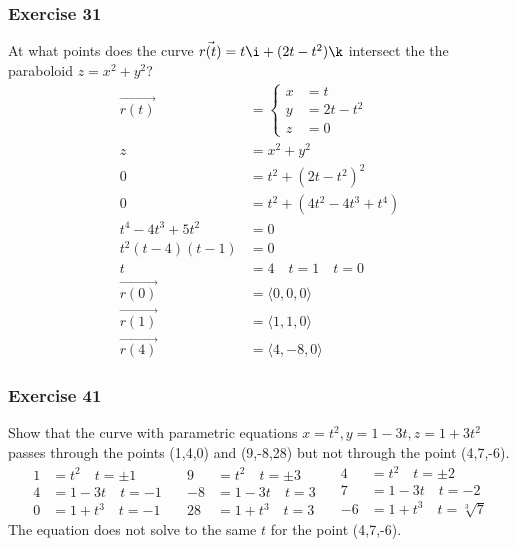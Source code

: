 \documentclass{math}
\begin{document}
\subsubsection*{Exercise 31}
At what points does the curve \( \vec{r(t)} = t\i+(2t-t^2)\k \) intersect the
the paraboloid \( z = x^2+y^2 \)?
\begin{align*}
  \overrightarrow{r(t)} &= \begin{cases}
    x &= t \\
    y &= 2t-t^2 \\
    z &= 0
  \end{cases} \\
  z &= x^2+y^2 \\
  0 &= t^2+(2t-t^2)^2 \\
  0 &= t^2+(4t^2-4t^3+t^4) \\
  t^4-4t^3+5t^2 &= 0 \\
  t^2(t-4)(t-1) &= 0 \\
  t &= 4 \quad t = 1 \quad t = 0 \\
  \overrightarrow{r(0)} &= \langle0,0,0\rangle \\
  \overrightarrow{r(1)} &= \langle1,1,0\rangle \\
  \overrightarrow{r(4)} &= \langle4,-8,0\rangle
\end{align*}

\subsubsection*{Exercise 41}
Show that the curve with parametric equations \( x = t^2, y = 1-3t, z = 1+3t^2
\) passes through the points (1,4,0) and (9,-8,28) but not through the point
(4,7,-6).
\[ \begin{split}
  1 &= t^2 \quad t = \pm1 \\
  4 &= 1-3t \quad t = -1 \\
  0 &= 1+t^3 \quad t = -1
\end{split}\quad\begin{split}
  9 &= t^2 \quad t = \pm3 \\
  -8 &= 1-3t \quad t = 3 \\
  28 &= 1+t^3 \quad t = 3
\end{split}\quad\begin{split}
  4 &= t^2 \quad t = \pm2 \\
  7 &= 1-3t \quad t = -2 \\
  -6 &= 1+t^3 \quad t = \sqrt[3]{7}
\end{split} \]
The equation does not solve to the same \( t \) for the point (4,7,-6).
\end{document}
